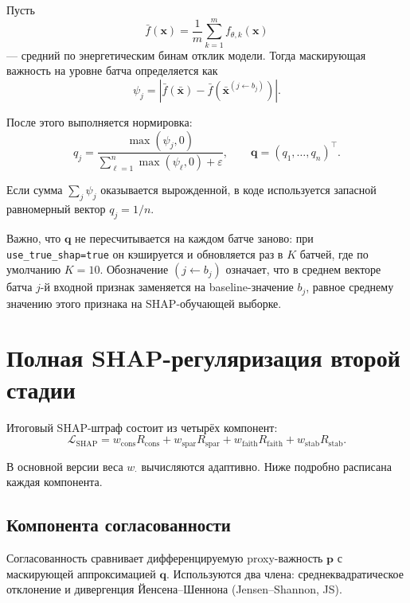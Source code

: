 \documentclass[11pt]{article}
\begin{document}
Пусть
\begin{equation}
\bar{f}(\mathbf{x}) = \frac{1}{m} \sum_{k=1}^{m} f_{\theta,k}(\mathbf{x})
\end{equation}
--- средний по энергетическим бинам отклик модели. Тогда маскирующая важность на уровне батча определяется как
\begin{equation}
 \psi_j = \left| \bar{f}(\bar{\mathbf{x}}) - \bar{f}(\bar{\mathbf{x}}^{(j \leftarrow b_j)}) \right|.
\end{equation}

После этого выполняется нормировка:
\begin{equation}
 q_j = \frac{\max(\psi_j,0)}{\sum_{\ell=1}^{n} \max(\psi_{\ell},0) + \varepsilon},
 \qquad
 \mathbf{q} = (q_1,\dots,q_n)^\top.
\end{equation}

Если сумма $\sum_j \psi_j$ оказывается вырожденной, в коде используется запасной равномерный вектор $q_j = 1/n$.

Важно, что $\mathbf{q}$ не пересчитывается на каждом батче заново: при \texttt{use\_true\_shap=true} он кэшируется и обновляется раз в $K$ батчей, где по умолчанию $K=10$.
Обозначение $(j \leftarrow b_j)$ означает, что в среднем векторе батча $j$-й входной признак заменяется на baseline-значение $b_j$, равное среднему значению этого признака на SHAP-обучающей выборке.

\section{Полная SHAP-регуляризация второй стадии}

Итоговый SHAP-штраф состоит из четырёх компонент:
\begin{equation}
\mathcal{L}_{\mathrm{SHAP}} = w_{\mathrm{cons}} R_{\mathrm{cons}} + w_{\mathrm{spar}} R_{\mathrm{spar}} + w_{\mathrm{faith}} R_{\mathrm{faith}} + w_{\mathrm{stab}} R_{\mathrm{stab}}.
\end{equation}

В основной версии веса $w_{\cdot}$ вычисляются адаптивно. Ниже подробно расписана каждая компонента.

\subsection{Компонента согласованности}

Согласованность сравнивает дифференцируемую proxy-важность $\mathbf{p}$ с маскирующей аппроксимацией $\mathbf{q}$. Используются два члена: среднеквадратическое отклонение и дивергенция Йенсена--Шеннона (Jensen--Shannon, JS).
\end{document}
